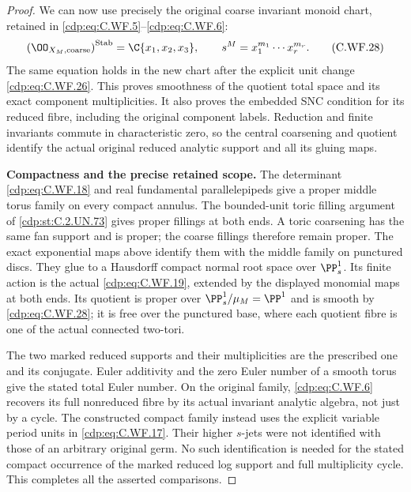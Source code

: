 \begin{proof}
We can now use precisely the original coarse invariant
monoid chart, retained in \eqref{cdp:eq:C.WF.5}--\eqref{cdp:eq:C.WF.6}:
\[
 \left(\OO_{X_M,\mathrm{coarse}}\right)^{\mathrm{Stab}}
        =\C\{x_1,x_2,x_3\},\qquad
       s^M=x_1^{m_1}\cdots x_r^{m_r}.
\tag{C.WF.28}\label{cdp:eq:C.WF.28}
\]
The same equation holds in the new chart after the
explicit unit change \eqref{cdp:eq:C.WF.26}.  This proves smoothness
of the quotient total space and its exact component
multiplicities.  It also proves the embedded SNC
condition for its reduced fibre, including the original
component labels.  Reduction and finite invariants
commute in characteristic zero, so the central
coarsening and quotient identify the actual original
reduced analytic support and all its gluing maps.

\par\medskip\noindent\textbf{Compactness and the precise retained scope.}
The determinant \eqref{cdp:eq:C.WF.18} and real fundamental
parallelepipeds give a proper middle torus family
on every compact annulus.  The bounded-unit
toric filling argument of \ref{cdp:st:C.2.UN.73} gives proper
fillings at both ends.  A toric coarsening has
the same fan support and is proper; the coarse
fillings therefore remain proper.  The exact
exponential maps above identify them with the
middle family on punctured discs.  They glue
to a Hausdorff compact normal root space over
\(\PP^1_s\).  Its finite action is the actual
\eqref{cdp:eq:C.WF.19}, extended by the displayed monomial
maps at both ends.  Its quotient is proper
over \(\PP^1_s/\mu_M=\PP^1\) and is smooth
by \eqref{cdp:eq:C.WF.28}; it is free over the punctured
base, where each quotient fibre is one of
the actual connected two-tori.

The two marked reduced supports and their
multiplicities are the prescribed one and
its conjugate.  Euler additivity and the
zero Euler number of a smooth torus give
the stated total Euler number.  On the
original family, \eqref{cdp:eq:C.WF.6} recovers its full
nonreduced fibre by its actual invariant
analytic algebra, not just by a cycle.
The constructed compact family instead
uses the explicit variable period units
in \eqref{cdp:eq:C.WF.17}.  Their higher \(s\)-jets were
not identified with those of an arbitrary
original germ.  No such identification is
needed for the stated compact occurrence
of the marked reduced log support and
full multiplicity cycle.  This completes
all the asserted comparisons.
\end{proof}


